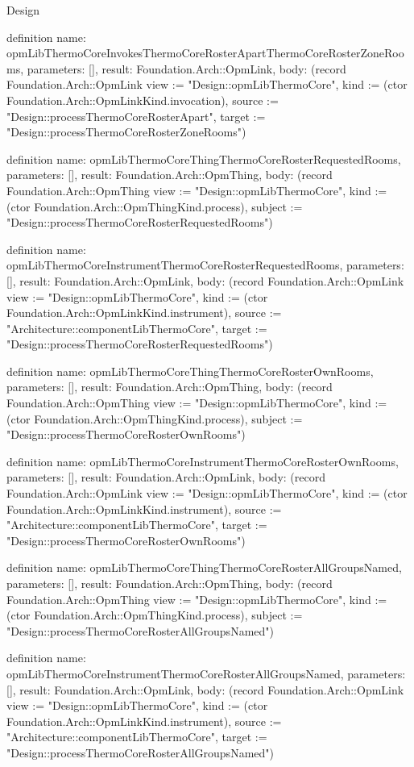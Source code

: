 \begin{lexlean}{Design}
\begin{semanticmodule}
definition{
  name: opmLibThermoCoreInvokesThermoCoreRosterApartThermoCoreRosterZoneRooms,
  parameters: [],
  result: Foundation.Arch::OpmLink,
  body: (record Foundation.Arch::OpmLink {view := "Design::opmLibThermoCore", kind := (ctor Foundation.Arch::OpmLinkKind.invocation), source := "Design::processThermoCoreRosterApart", target := "Design::processThermoCoreRosterZoneRooms"})
}

definition{
  name: opmLibThermoCoreThingThermoCoreRosterRequestedRooms,
  parameters: [],
  result: Foundation.Arch::OpmThing,
  body: (record Foundation.Arch::OpmThing {view := "Design::opmLibThermoCore", kind := (ctor Foundation.Arch::OpmThingKind.process), subject := "Design::processThermoCoreRosterRequestedRooms"})
}

definition{
  name: opmLibThermoCoreInstrumentThermoCoreRosterRequestedRooms,
  parameters: [],
  result: Foundation.Arch::OpmLink,
  body: (record Foundation.Arch::OpmLink {view := "Design::opmLibThermoCore", kind := (ctor Foundation.Arch::OpmLinkKind.instrument), source := "Architecture::componentLibThermoCore", target := "Design::processThermoCoreRosterRequestedRooms"})
}

definition{
  name: opmLibThermoCoreThingThermoCoreRosterOwnRooms,
  parameters: [],
  result: Foundation.Arch::OpmThing,
  body: (record Foundation.Arch::OpmThing {view := "Design::opmLibThermoCore", kind := (ctor Foundation.Arch::OpmThingKind.process), subject := "Design::processThermoCoreRosterOwnRooms"})
}

definition{
  name: opmLibThermoCoreInstrumentThermoCoreRosterOwnRooms,
  parameters: [],
  result: Foundation.Arch::OpmLink,
  body: (record Foundation.Arch::OpmLink {view := "Design::opmLibThermoCore", kind := (ctor Foundation.Arch::OpmLinkKind.instrument), source := "Architecture::componentLibThermoCore", target := "Design::processThermoCoreRosterOwnRooms"})
}

definition{
  name: opmLibThermoCoreThingThermoCoreRosterAllGroupsNamed,
  parameters: [],
  result: Foundation.Arch::OpmThing,
  body: (record Foundation.Arch::OpmThing {view := "Design::opmLibThermoCore", kind := (ctor Foundation.Arch::OpmThingKind.process), subject := "Design::processThermoCoreRosterAllGroupsNamed"})
}

definition{
  name: opmLibThermoCoreInstrumentThermoCoreRosterAllGroupsNamed,
  parameters: [],
  result: Foundation.Arch::OpmLink,
  body: (record Foundation.Arch::OpmLink {view := "Design::opmLibThermoCore", kind := (ctor Foundation.Arch::OpmLinkKind.instrument), source := "Architecture::componentLibThermoCore", target := "Design::processThermoCoreRosterAllGroupsNamed"})
}


\end{semanticmodule}
\end{lexlean}
